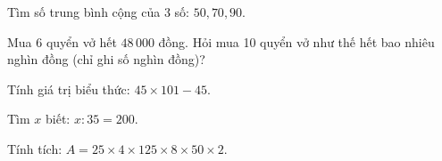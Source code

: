\begin{ex} %
Tìm số trung bình cộng của 3 số: $50, 70, 90$.
\end{ex}

\begin{ex} %
Mua 6 quyển vở hết $48\,000$ đồng. Hỏi mua 10 quyển vở như thế hết bao nhiêu nghìn đồng (chỉ ghi số nghìn đồng)?
\end{ex}

\begin{ex} %
Tính giá trị biểu thức: $45 \times 101 - 45$.
\end{ex}

\begin{ex} %
Tìm $x$ biết: $x : 35 = 200$.
\end{ex}

\begin{ex} %
Tính tích: $A = 25 \times 4 \times 125 \times 8 \times 50 \times 2$.
\end{ex}
